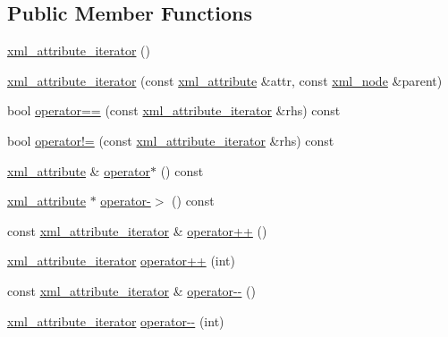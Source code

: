 \subsection*{Public Member Functions}
\begin{DoxyCompactItemize}
\item 
\hyperlink{classpugi_1_1xml__attribute__iterator_a857691abc7ce5cfa3a0b6a91b4df8bd0}{xml\-\_\-attribute\-\_\-iterator} ()
\item 
\hyperlink{classpugi_1_1xml__attribute__iterator_a7310bb0a37f918b7b499f9ccfc52df52}{xml\-\_\-attribute\-\_\-iterator} (const \hyperlink{classpugi_1_1xml__attribute}{xml\-\_\-attribute} \&attr, const \hyperlink{classpugi_1_1xml__node}{xml\-\_\-node} \&parent)
\item 
bool \hyperlink{classpugi_1_1xml__attribute__iterator_a59277df18741e5243c83e040b03e49ed}{operator==} (const \hyperlink{classpugi_1_1xml__attribute__iterator}{xml\-\_\-attribute\-\_\-iterator} \&rhs) const 
\item 
bool \hyperlink{classpugi_1_1xml__attribute__iterator_aed17d2f060c0c792a5f93dfca0f6fb33}{operator!=} (const \hyperlink{classpugi_1_1xml__attribute__iterator}{xml\-\_\-attribute\-\_\-iterator} \&rhs) const 
\item 
\hyperlink{classpugi_1_1xml__attribute}{xml\-\_\-attribute} \& \hyperlink{classpugi_1_1xml__attribute__iterator_a896b6564606b6e24c46b1e10a63df47a}{operator$\ast$} () const 
\item 
\hyperlink{classpugi_1_1xml__attribute}{xml\-\_\-attribute} $\ast$ \hyperlink{classpugi_1_1xml__attribute__iterator_aa6b76277e8acd1a7eabe226179a006f6}{operator-\/$>$} () const 
\item 
const \hyperlink{classpugi_1_1xml__attribute__iterator}{xml\-\_\-attribute\-\_\-iterator} \& \hyperlink{classpugi_1_1xml__attribute__iterator_af291afcde44b67e836e148af904e6f0f}{operator++} ()
\item 
\hyperlink{classpugi_1_1xml__attribute__iterator}{xml\-\_\-attribute\-\_\-iterator} \hyperlink{classpugi_1_1xml__attribute__iterator_aae744b06711aea8ebd68159cd4e0aaaa}{operator++} (int)
\item 
const \hyperlink{classpugi_1_1xml__attribute__iterator}{xml\-\_\-attribute\-\_\-iterator} \& \hyperlink{classpugi_1_1xml__attribute__iterator_a7ac06eb61d47a9e57bcd0fd2434c6243}{operator-\/-\/} ()
\item 
\hyperlink{classpugi_1_1xml__attribute__iterator}{xml\-\_\-attribute\-\_\-iterator} \hyperlink{classpugi_1_1xml__attribute__iterator_a48737f6e77abe7fa3e80841597dc93e1}{operator-\/-\/} (int)
\end{DoxyCompactItemize}
